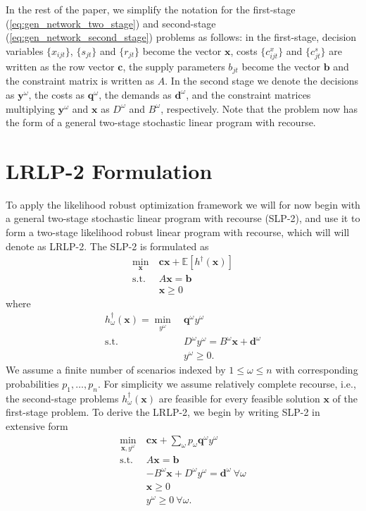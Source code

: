 \documentclass[11pt]{article}
\newcommand{\e}[1]{\mathbb{E} \left[ #1 \right]}
\newcommand{\x}{\mathbf{x}}
\newcommand{\y}{\mathbf{y}}
\renewcommand{\c}{\mathbf{c}}
\newcommand{\q}{\mathbf{q}}
\renewcommand{\b}{\mathbf{b}}
\renewcommand{\d}{\mathbf{d}}
\newcommand{\st}{\mbox{s.t.}}
\begin{document}
In the rest of the paper, we simplify the notation for the first-stage (\ref{eq:gen_network_two_stage}) and second-stage (\ref{eq:gen_network_second_stage}) problems as follows: in the first-stage, decision variables $\{x_{ijt}\}$, $\{s_{jt}\}$ and $\{r_{jt}\}$ become the vector $\x$, costs $\{c_{ijt}^x\}$ and $\{c_{jt}^s\}$ are written as the row vector $\c$, the supply parameters $b_{jt}$ become the vector $\b$ and the constraint matrix is written as $A$.  In the second stage we denote the decisions as $\y^\omega$, the costs as $\q^\omega$, the demands as $\d^\omega$, and the constraint matrices multiplying $\y^\omega$ and $\x$ as $D^\omega$ and $B^\omega$, respectively.  Note that the problem now has the form of a general two-stage stochastic linear program with recourse.

\section{LRLP-2 Formulation} \label{sec:lrlp2}

To apply the likelihood robust optimization framework we will for now begin with a general two-stage stochastic linear program with recourse (SLP-2), and use it to form a two-stage likelihood robust linear program with recourse, which will will denote as LRLP-2.  The SLP-2 is formulated as
\begin{align*}
	\min_\x \ & \c\x + \e{h^\dagger(\x)} \\
	\st \ & A\x = \b \\
	& \x \geq 0
\end{align*}
where
\begin{align}
	h^\dagger_\omega(\x) = \min_{y^\omega} \ & \q^\omega y^\omega \label{eq:slp_second_stage} \\
	\st \ & D^\omega y^\omega = B^\omega \x + \d^\omega \nonumber \\
	& y^\omega \geq 0. \nonumber
\end{align}
We assume a finite number of scenarios indexed by $1 \leq \omega \leq n$ with corresponding probabilities $p_1, \dots, p_n$.  For simplicity we assume relatively complete recourse, i.e., the second-stage problems $h^\dagger_\omega(\x)$ are feasible for every feasible solution $\x$ of the first-stage problem.  To derive the LRLP-2, we begin by writing SLP-2 in extensive form
\begin{align*}
	\min_{\x,y^\omega} \ & \c\x + \sum_\omega p_\omega \q^\omega y^\omega \\
	\st \ & A\x = \b \\
	& -B^\omega \x + D^\omega y^\omega = \d^\omega\ \forall \omega \\
	& \x \geq 0 \\
	& y^\omega \geq 0\ \forall \omega.
\end{align*}
\end{document}
